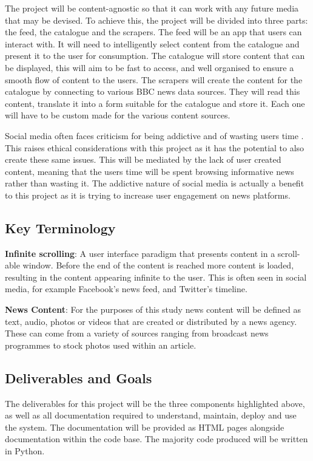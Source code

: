 \documentclass[12pt,titlepage]{article}
\begin{document}
  The project will be content-agnostic so that it can work with any future media
  that may be devised. To achieve this, the project will be divided into three
  parts: the feed, the catalogue and the scrapers. The feed will be an app that
  users can interact with. It will need to intelligently select content from the
  catalogue and present it to the user for consumption. The catalogue will store
  content that can be displayed, this will aim to be fast to access, and well
  organised to ensure a smooth flow of content to the users. The scrapers will
  create the content for the catalogue by connecting to various BBC news data
  sources. They will read this content, translate it into a form suitable for
  the catalogue and store it. Each one will have to be custom made for the
  various content sources.

  Social media often faces criticism for being addictive and of wasting users
  time \citep{neyman}. This raises ethical considerations with this project as it
  has the potential to also create these same issues. This will be mediated by
  the lack of user created content, meaning that the users time will be spent
  browsing informative news rather than wasting it. The addictive nature of
  social media is actually a benefit to this project as it is trying to
  increase user engagement on news platforms.

  \subsection{Key Terminology}

  \textbf{Infinite scrolling}: A user interface paradigm that presents content in a
  scroll-able window. Before the end of the content is reached more content is
  loaded, resulting in the content appearing infinite to the user. This is often
  seen in social media, for example Facebook's news feed, and Twitter's timeline.

  \textbf{News Content}: For the purposes of this study news content will be
  defined as text, audio, photos or videos that are created or distributed by a
  news agency. These can come from a variety of sources ranging from broadcast
  news programmes to stock photos used within an article.

  \subsection{Deliverables and Goals}

  The deliverables for this project will be the three components highlighted
  above, as well as all documentation required to understand, maintain, deploy
  and use the system. The documentation will be provided as HTML pages alongside
  documentation within the code base. The majority code produced will be written
  in Python.
\end{document}
